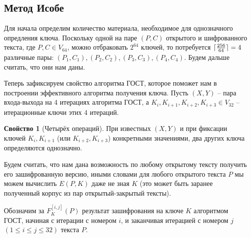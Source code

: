 \documentclass[a4paper,12pt]{article}
\DeclarePairedDelimiter{\ceil}{\lceil}{\rceil}
\theoremstyle{definition}
\newtheorem{property}{Свойство}[subsection]
\begin{document}
	\subsection*{Метод Исобе}
	
	Для начала определим количество материала, необходимое для однозначного опредления ключа. Поскольку одной на паре $(P, C)$ открытого и шифрованного текста, где $P, C \in V_{64}$, можно отбраковать $2^{64}$ ключей, то потребуется $\ceil{\frac{256}{64}} = 4$ различные пары: $(P_1, C_1), (P_2, C_2), (P_3, C_3), (P_4, C_4)$. Будем дальше считать, что они нам даны.
	
	Теперь зафиксируем свойство алгоритма ГОСТ, которое поможет нам в построении эффективного алгоритма получения ключа. Пусть $(X, Y)$ -- пара входа-выхода на 4 итерациях алгоритма ГОСТ, 
	а $K_i, K_{i+1}, K_{i+2}, K_{i+3} \in V_{32}$ -- итерационные ключи этих 4 итераций.
	
	\begin{property}[Четырёх операций] \label{prop:4op}
		При известных $(X, Y)$ и при фиксации ключей $K_{i}, K_{i+1}$ (или $K_{i+2}, K_{i+3}$) конкретными значениями, два других ключа определяются однозначно.
	\end{property}
	
	Будем считать, что нам дана возможность по любому открытому тексту получить его зашифрованную версию, иными словами для любого открытого текста $P$ мы можем вычислить $E(P, K)$ даже не зная $K$ (это может быть заранее полученный корпус из пар открытый-закрытый тексты).
	
	Обозначим за $F_K^{[i, j]}(P)$ результат зашифрования на ключе $K$ алгоритмом ГОСТ, начиная с итерации с номером $i$, и заканчивая итерацией с номером $j$ $(1 \le i \le j \le 32)$ текста $P$.
\end{document}
